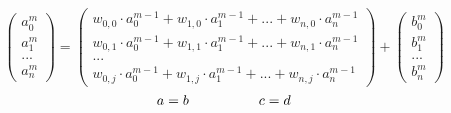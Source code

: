 \documentclass{article}
\begin{document}
 \[
\left(\begin{array}{c} a_0^m \\ a_1^m \\ ... \\ a_n^m \end{array}\right)
=
\left(\begin{array}{c}
    w_{0,0} \cdot a_0^{m-1} + w_{1,0} \cdot a_1^{m-1} + ... + w_{n,0} \cdot a_n^{m-1} \\
    w_{0,1} \cdot a_0^{m-1} + w_{1,1} \cdot a_1^{m-1} + ... + w_{n,1} \cdot a_n^{m-1} \\
    ... \\
    w_{0,j} \cdot a_0^{m-1} + w_{1,j} \cdot a_1^{m-1} + ... + w_{n,j} \cdot a_n^{m-1}
\end{array}\right)
+
\left(\begin{array}{c} b_0^m \\ b_1^m \\ ... \\ b_n^m \end{array}\right)
\]
\[ a = b \kern 50pt c = d \]
\end{document}

